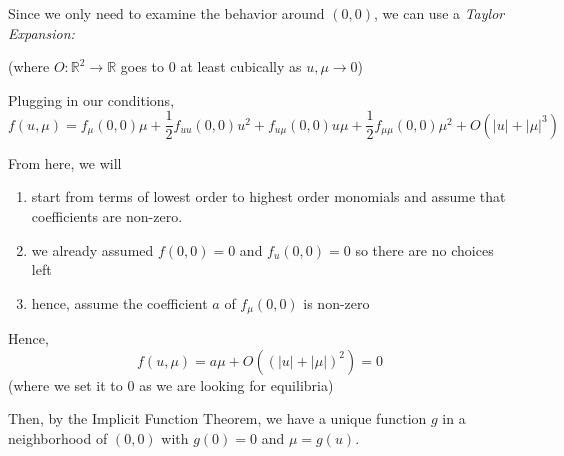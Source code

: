 \documentclass[12pt]{report}
\newcommand{\R}{\mathbb{R}}
\newcommand{\abs}[1]{\left\vert #1 \right\vert}
\begin{document}
Since we only need to examine the behavior around $(0, 0)$, we can use a \emph{Taylor Expansion:}

(where $O: \R^2 \to \R$ goes to $0$ at least cubically as $u, \mu \to 0$)

Plugging in our conditions,
\[f(u, \mu) = f_{\mu}(0, 0) \mu + \frac{1}{2}f_{uu}(0,0)u^2 + f_{u\mu}(0, 0)u\mu + \frac{1}{2}f_{\mu\mu}(0, 0)\mu^2 + O({\abs{u}+ \abs{\mu}}^3)\]

From here, we will
\begin{enumerate}
    \item start from terms of lowest order to highest order monomials and assume that coefficients are non-zero.
    \item we already assumed $f(0, 0) = 0$ and $f_u(0, 0) = 0$ so there are no choices left
    \item hence, assume the coefficient $a$ of $f_{\mu}(0, 0)$ is non-zero
\end{enumerate}

Hence,
\[f(u, \mu) = a\mu + O((\abs{u} + \abs{\mu})^2) = 0\]
(where we set it to $0$ as we are looking for equilibria)

Then, by the Implicit Function Theorem, we have a unique function $g$ in a neighborhood of $(0, 0)$ with $g(0) = 0$ and $\mu = g(u)$.
\end{document}
